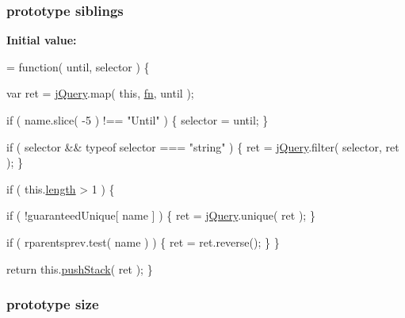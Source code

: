 \hypertarget{jquery-1_810_82-vsdoc_8js_a0e6e8c52ac2dbde17cbca14513a6a388}{
\subsubsection[{siblings}]{ {\bf prototype} siblings}}\label{jquery-1_810_82-vsdoc_8js_a0e6e8c52ac2dbde17cbca14513a6a388}
{\bfseries Initial value\-:}
\begin{DoxyCode}
= \textcolor{keyword}{function}( until, selector ) \{


        var ret = \hyperlink{jquery-1_810_82-vsdoc_8js_add5237586d970a38a81f990e8eb28c6c}{jQuery}.map( \textcolor{keyword}{this}, \hyperlink{jquery-1_810_82-vsdoc_8js_acef6bdaf6b9b20fdcca1ea86f0902c3b}{fn}, until );

        \textcolor{keywordflow}{if} ( name.slice( -5 ) !== \textcolor{stringliteral}{"Until"} ) \{
            selector = until;
        \}

        \textcolor{keywordflow}{if} ( selector && typeof selector === \textcolor{stringliteral}{"string"} ) \{
            ret = \hyperlink{jquery-1_810_82-vsdoc_8js_add5237586d970a38a81f990e8eb28c6c}{jQuery}.filter( selector, ret );
        \}

        \textcolor{keywordflow}{if} ( this.\hyperlink{jquery-1_810_82-vsdoc_8js_aa7de35d58da66d9944ab9cbe82c19640}{length} > 1 ) \{
            
            \textcolor{keywordflow}{if} ( !guaranteedUnique[ name ] ) \{
                ret = \hyperlink{jquery-1_810_82-vsdoc_8js_add5237586d970a38a81f990e8eb28c6c}{jQuery}.unique( ret );
            \}

            
            \textcolor{keywordflow}{if} ( rparentsprev.test( name ) ) \{
                ret = ret.reverse();
            \}
        \}

        \textcolor{keywordflow}{return} this.\hyperlink{jquery-1_810_82-vsdoc_8js_afc3a7db1ef2b526338c06c07cecccd44}{pushStack}( ret );
    \}
\end{DoxyCode}
\hypertarget{jquery-1_810_82-vsdoc_8js_a03f3d007acfdfcc364390ec0d718fb34}{
\subsubsection[{size}]{ {\bf prototype} size}}\label{jquery-1_810_82-vsdoc_8js_a03f3d007acfdfcc364390ec0d718fb34}
